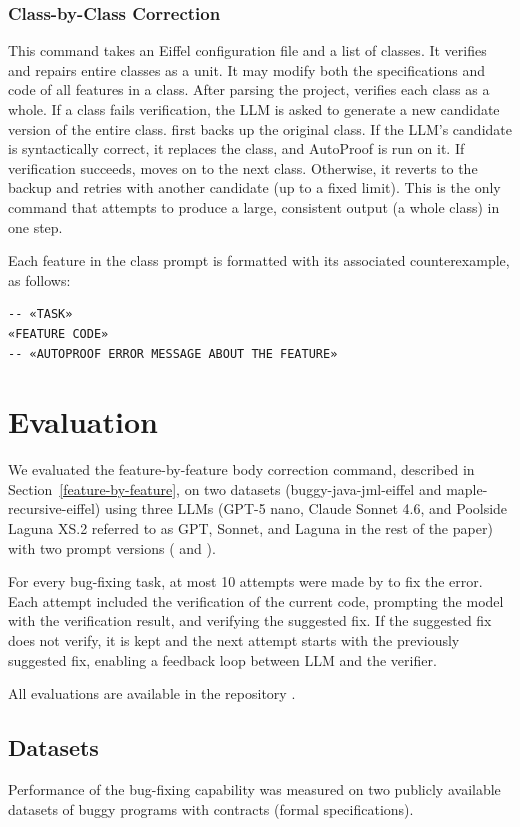 \documentclass[runningheads]{llncs}
\newcommand{\secref}[1]{Section~\ref{#1}}
\begin{document}
\subsubsection{Class-by-Class Correction}\label{class-by-class}
This command takes an Eiffel configuration file and a list of classes.
It verifies and repairs entire classes as a unit.
It may modify both the specifications and code of all features in a class.
After parsing the project, \toolname{} verifies each class as a whole.
If a class fails verification, the LLM is asked to generate a new candidate version of the entire class.
\toolname{} first backs up the original class.
If the LLM's candidate is syntactically correct, it replaces the class, and AutoProof is run on it.
If verification succeeds, \toolname{} moves on to the next class.
Otherwise, it reverts to the backup and retries with another candidate (up to a fixed limit).
This is the only command that attempts to produce a large, consistent output (a whole class) in one step.

Each feature in the class prompt is formatted with its associated counterexample, as follows:

\begin{lstlisting}
-- «TASK»
«FEATURE CODE»
-- «AUTOPROOF ERROR MESSAGE ABOUT THE FEATURE»
\end{lstlisting}

\section{Evaluation}\label{evaluation}
We evaluated the feature-by-feature body correction command,
described in \secref{feature-by-feature},
on two datasets (buggy-java-jml-eiffel and maple-recursive-eiffel)
using three LLMs (GPT-5 nano, Claude Sonnet 4.6, and Poolside Laguna XS.2
referred to as GPT, Sonnet, and Laguna in the rest of the paper)
with two prompt versions (\rich{} and \bare{}).

For every bug-fixing task, at most 10 attempts were made by \toolname{}
to fix the error. Each attempt included the verification of the current code,
prompting the model with the verification result, and verifying the
suggested fix. If the suggested fix does not verify, it is kept
and the next attempt starts with the previously suggested fix, enabling
a feedback loop between LLM and the verifier.

All evaluations are available in the \toolname{} repository \cite{eiffel-tools}.

\subsection{Datasets}
Performance of the bug-fixing capability was measured on two publicly available
datasets of buggy programs with contracts (formal specifications).
\end{document}
